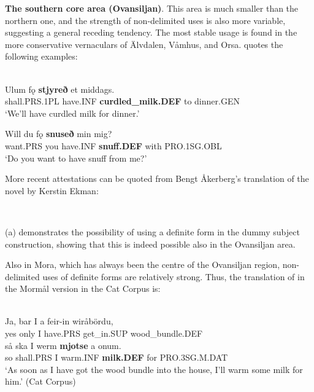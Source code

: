 \z

\textbf{The southern core area (Ovansiljan)}. This area is much smaller than the northern one, and the strength of non-delimited uses is also more variable, suggesting a general receding tendency. The most stable usage is found in the more conservative vernaculars of Älvdalen, Våmhus, and Orsa. \citet[95]{Levander1909} quotes the following examples:

\ea\label{}
\\
\gll Ulum  fǫ  \textbf{stjyreð} et  middags.  \\
shall.PRS.1PL  have.INF  \textbf{curdled\_milk.DEF} to  dinner.GEN\footnotemark{} \\
\glt ‘We’ll have curdled milk for dinner.’

\z
{} 
\ea
\gll Will  du  fǫ  \textbf{snuseð} min  mig?\\
want.PRS  you  have.INF  \textbf{snuff.DEF} with  PRO.1SG.OBL\\
\glt  ‘Do you want to have snuff from me?’

\z

More recent attestations can be quoted from Bengt Åkerberg’s translation of the novel  by Kerstin Ekman:

\ea\label{}
\\
	\z
\z 
	
	(a) demonstrates the possibility of using a definite form in the dummy subject construction, showing that this is indeed possible also in the Ovansiljan area. 

Also in Mora, which has always been the centre of the Ovansiljan region, non-delimited uses of definite forms are relatively strong. Thus, the translation of  in the Mormål version in the Cat Corpus is:

\ea \label{} 
\\
\gll Ja,  bar  I  a  feir-in  wiråbördu,\\
yes  only  I  have.PRS  get\_in.SUP  wood\_bundle.DEF\\
\gll så  ska  I  werm  \textbf{mjotse} a  onum.\\
so  shall.PRS  I  warm.INF  \textbf{milk.DEF} for  PRO.3SG.M.DAT\\
\glt ‘As soon as I have got the wood bundle into the house, I’ll warm some milk for him.’ (Cat Corpus)

